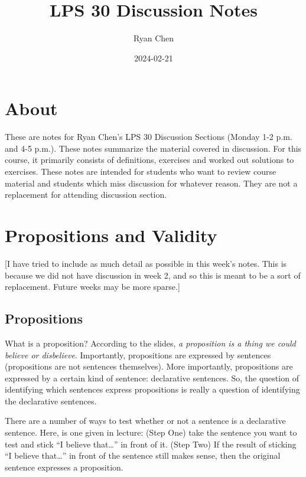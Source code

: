 \documentclass[
]{book}
\title{LPS 30 Discussion Notes}
\author{Ryan Chen}
\date{2024-02-21}
\begin{document}
\maketitle

{
\setcounter{tocdepth}{1}
\tableofcontents
}
\hypertarget{about}{%
\chapter{About}\label{about}}

These are notes for Ryan Chen's LPS 30 Discussion Sections (Monday 1-2 p.m. and 4-5 p.m.). These notes summarize the material covered in discussion. For this course, it primarily consists of definitions, exercises and worked out solutions to exercises. These notes are intended for students who want to review course material and students which miss discussion for whatever reason. They are not a replacement for attending discussion section.

\hypertarget{propositions-and-validity}{%
\chapter{Propositions and Validity}\label{propositions-and-validity}}

{[}I have tried to include as much detail as possible in this week's notes. This is because we did not have discussion in week 2, and so this is meant to be a sort of replacement. Future weeks may be more sparse.{]}

\hypertarget{propositions}{%
\section{Propositions}\label{propositions}}

What is a proposition? According to the slides, \emph{a proposition is a thing we could believe or disbelieve}. Importantly, propositions are expressed by sentences (propositions are not sentences themselves). More importantly, propositions are expressed by a certain kind of sentence: declarative sentences. So, the question of identifying which sentences express propositions is really a question of identifying the declarative sentences.

There are a number of ways to test whether or not a sentence is a declarative sentence. Here, is one given in lecture: (Step One) take the sentence you want to test and stick ``I believe that\ldots{}'' in front of it. (Step Two) If the result of sticking ``I believe that\ldots{}'' in front of the sentence still makes sense, then the original sentence expresses a proposition.
\end{document}
